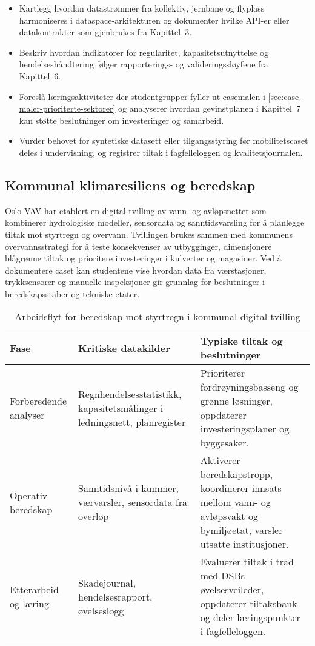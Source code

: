 \begin{itemize}
    \item Kartlegg hvordan datastrømmer fra kollektiv, jernbane og flyplass harmoniseres i dataspace-arkitekturen og dokumenter hvilke API-er eller datakontrakter som gjenbrukes fra Kapittel~3.
    \item Beskriv hvordan indikatorer for regularitet, kapasitetsutnyttelse og hendelseshåndtering følger rapporterings- og valideringssløyfene fra Kapittel~6.
    \item Foreslå læringsaktiviteter der studentgrupper fyller ut casemalen i \autoref{sec:case-maler-prioriterte-sektorer} og analyserer hvordan gevinstplanen i Kapittel~7 kan støtte beslutninger om investeringer og samarbeid.
    \item Vurder behovet for syntetiske datasett eller tilgangsstyring før mobilitetscaset deles i undervisning, og registrer tiltak i fagfelleloggen og kvalitetsjournalen.
\end{itemize}

\subsection*{Kommunal klimaresiliens og beredskap}
Oslo VAV har etablert en digital tvilling av vann- og avløpsnettet som kombinerer hydrologiske modeller, sensordata og sanntidsvarsling for å planlegge tiltak mot styrtregn og overvann.\citep{oslovav2023digital} Tvillingen brukes sammen med kommunens overvannsstrategi for å teste konsekvenser av utbygginger, dimensjonere blågrønne tiltak og prioritere investeringer i kulverter og magasiner.\citep{oslo2023overvann} Ved å dokumentere caset kan studentene vise hvordan data fra værstasjoner, trykksensorer og manuelle inspeksjoner gir grunnlag for beslutninger i beredskapsstaber og tekniske etater.

\begin{table}[h]
    \centering
    \caption{Arbeidsflyt for beredskap mot styrtregn i kommunal digital tvilling}
    \label{tab:kommunal-beredskap}
    \begin{tabular}{p{3.4cm}p{4.5cm}p{5.0cm}}
        \toprule
        Fase & Kritiske datakilder & Typiske tiltak og beslutninger \\
        \midrule
        Forberedende analyser & Regnhendelsesstatistikk, kapasitetsmålinger i ledningsnett, planregister & Prioriterer fordrøyningsbasseng og grønne løsninger, oppdaterer investeringsplaner og byggesaker. \\
        Operativ beredskap & Sanntidsnivå i kummer, værvarsler, sensordata fra overløp & Aktiverer beredskapstropp, koordinerer innsats mellom vann- og avløpsvakt og bymiljøetat, varsler utsatte institusjoner. \\
        Etterarbeid og læring & Skadejournal, hendelsesrapport, øvelseslogg & Evaluerer tiltak i tråd med DSBs øvelsesveileder, oppdaterer tiltaksbank og deler læringspunkter i fagfelleloggen.\citep{dsb2024nser,dsb2023ovelser} \\
        \bottomrule
    \end{tabular}
\end{table}

